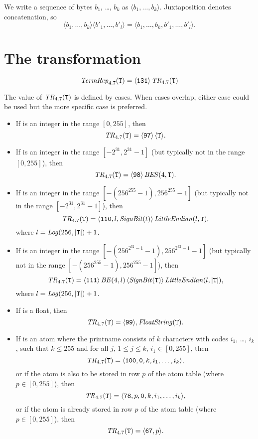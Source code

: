 We write a sequence of bytes $b_1$, \ldots, $b_k$ as $\langle
b_1,\ldots,b_k\rangle$.  Juxtaposition denotes concatenation, so
\[\langle b_1,\ldots,b_k\rangle
\langle b'_1,\ldots,b'_l\rangle = \langle b_1,\ldots,b_k,b'_1,\ldots,b'_l\rangle.\]

\section{The transformation}

\[{\it TermRep}_{4.7}({\tt{\sl T}}) = \langle{\tt131}\rangle\,{\it TR}_{4.7}({\tt{\sl T}})\]

The value of ${\it TR}_{4.7}({\tt{\sl T}})$ is defined by cases.  When cases
overlap, either case could be used but the more specific case is
preferred.
\begin{itemize}
\item If  is an integer in the range $[0,255]$, then
\[{\it TR}_{4.7}({\tt{\sl T}}) = \langle{\tt97}\rangle\,\langle{\tt{\sl T}}\rangle.\]
\item If  is an integer in the range $[-2^{31},2^{31}-1]$
(but typically not in the range $[0,255]$), then
\[{\it TR}_{4.7}({\tt{\sl T}}) = \langle{\tt98}\rangle\,{\it BES}(4,{\tt{\sl T}}).\]
\item If  is an integer in the range $[-(256^{255}-1),256^{255}-1]$
(but typically not in the range $[-2^{31},2^{31}-1]$), then
\[{\it TR}_{4.7}({\tt{\sl T}}) =
\langle{\tt110},l,{\it SignBit}(t)\rangle\,{\it LittleEndian}(l,{\tt{\sl T}}),\]
where $l={\it Log}(256,|{\tt{\sl T}}|)+1$.
\item If  is an integer in the range $[-(256^{2^{32}-1}-1),256^{2^{32}-1}-1]$
(but typically not in the range $[-(256^{255}-1),256^{255}-1]$), then
\[{\it TR}_{4.7}({\tt{\sl T}}) =
\langle{\tt111}\rangle\,{\it BE}(4,l)\,
\langle{\it SignBit}({\tt{\sl T}})\rangle\,
{\it LittleEndian}(l,|{\tt{\sl T}}|),\]
where $l={\it Log}(256,|{\tt{\sl T}}|)+1$.
\item If  is a float, then
\[{\it TR}_{4.7}({\tt{\sl T}}) = \langle{\tt99}\rangle,{\it FloatString}({\tt{\sl T}}).\]
\item If  is an atom where the printname consists of $k$ characters with codes
$i_1$, \ldots, $i_k$, such that $k\leq255$ and for all $j$, $1\leq j\leq k$,
$i_1\in[0,255]$, then
\[{\it TR}_{4.7}({\tt{\sl T}}) = \langle{\tt100},{\tt0},k,i_1,\ldots,i_k\rangle,\]
or if the atom is also to be stored in row $p$ of the atom table (where $p\in[0,255]$),
then
\[{\it TR}_{4.7}({\tt{\sl T}}) = \langle{\tt78},p,{\tt0},k,i_1,\ldots,i_k\rangle,\]
or if the atom is already stored in row $p$ of the atom table (where $p\in[0,255]$),
then
\[{\it TR}_{4.7}({\tt{\sl T}}) = \langle{\tt67},p\rangle.\]

\end{itemize}
